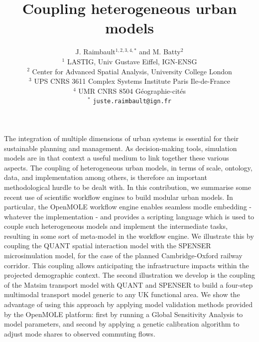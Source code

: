 \documentclass[10pt]{article}
\title{Coupling heterogeneous urban models}
\author{J. Raimbault$^{1,2,3,4,\ast}$ and M. Batty$^{2}$\medskip\\
$^{1}$ LASTIG, Univ Gustave Eiffel, IGN-ENSG\\
$^{2}$ Center for Advanced Spatial Analysis, University College London\\
$^{3}$ UPS CNRS 3611 Complex Systems Institute Paris Ile-de-France\\
$^{4}$ UMR CNRS 8504 G{\'e}ographie-cit{\'e}s\medskip\\
$^{\ast}$ \texttt{juste.raimbault@ign.fr}
}
\date{}
\begin{document}
\maketitle

The integration of multiple dimensions of urban systems is essential for their sustainable planning and management. As decision-making tools, simulation models are in that context a useful medium to link together these various aspects. The coupling of heterogeneous urban models, in terms of scale, ontology, data, and implementation among others, is therefore an important methodological hurdle to be dealt with. In this contribution, we summarise some recent use of scientific workflow engines to build modular urban models. In particular, the OpenMOLE workflow engine enables seamless modle embedding - whatever the implementation - and provides a scripting language which is used to couple such heterogeneous models and implement the intermediate tasks, resulting in some sort of meta-model in the workflow engine. We illustrate this by coupling the QUANT spatial interaction model with the SPENSER microsimulation model, for the case of the planned Cambridge-Oxford railway corridor. This coupling allows anticipating the infrastructure impacts within the projected demographic context. The second illustration we develop is the coupling of the Matsim transport model with QUANT and SPENSER to build a four-step multimodal transport model generic to any UK functional area. We show the advantage of using this approach by applying model validation methods provided by the OpenMOLE platform: first by running a Global Sensitivity Analysis to model parameters, and second by applying a genetic calibration algorithm to adjust mode shares to observed commuting flows.

	
\end{document}
